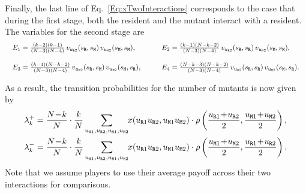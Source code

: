 \documentclass[11pt]{article}
\def\resident{\texttt{R}}
\def\mutant{\texttt{M}}
\def\strategy{s}
\theoremstyle{plainCl1}
\theoremstyle{plainCl2}
\begin{document}
Finally, the last line of Eq.~\eqref{Eq:xTwoInteractions} corresponds to the case that during the first stage, both the resident and the mutant interact with a resident. The variables for the second stage are
\begin{equation*}
  \setlength{\arraycolsep}{10pt}
    \begin{array}{llrl}
   E_1  = \frac{(k - 2)(k - 1)}{(N-3)(N-4)}\, v_{u_{\resident 2}}(\strategy_\resident,\strategy_\mutant)\, v_{u_{\mutant 2}}(\strategy_\mutant,\strategy_\mutant) , \quad
   &E_2 = \frac{\left(k - 1\right) \left(N - k - 2\right)}{(N - 3) (N - 4)}\, v_{u_{\resident 2}}(\strategy_\resident,\strategy_\resident)\, v_{u_{\mutant 2}}(\strategy_\mutant,\strategy_\mutant) , \\[0.5cm] 
   E_3  = \frac{\left(k - 1\right) \left(N - k - 2\right)}{(N - 3) (N - 4)}\, v_{u_{\resident 2}}(\strategy_\resident,\strategy_\mutant)\, v_{u_{\mutant 2}}(\strategy_\mutant,\strategy_\resident) , \quad
   &E_4 = \frac{\left(N - k - 3\right) \left(N - k - 2\right)}{(N - 3) (N - 4)} \,v_{u_{\resident 2}}(\strategy_\resident,\strategy_\resident)\, v_{u_{\mutant 2}}(\strategy_\mutant,\strategy_\resident) .
  \end{array}
\end{equation*}


\noindent
As a result, the transition probabilities for the number of mutants is now given by
\begin{equation}\label{eq:ratio_TwoInteractions}
\begin{array}{l}
\displaystyle \lambda^+_k=\frac{N\!-\!k}{N}\cdot \frac{k}{N} \sum_{u_{\resident 1},u_{\resident 2},u_{\mutant 1},u_{\mutant 2}} \hspace{-0.1cm} x(u_{\resident 1}u_{\resident 2}, u_{\mutant 1}u_{\mutant 2})\cdot \rho\left(\frac{u_{\resident 1} \!+\! u_{\resident 2}}{2}, \frac{u_{\mutant 1} \!+\! u_{\mutant 2}}{2}\right), \\[0.5cm]
\displaystyle \lambda^-_k=\frac{N\!-\!k}{N}\cdot \frac{k}{N} \sum_{u_{\resident 1},u_{\resident 2},u_{\mutant 1},u_{\mutant 2}} \hspace{-0.1cm} x(u_{\resident 1}u_{\resident 2},u_{\mutant 1}u_{\mutant 2})\cdot \rho\left(\frac{u_{\mutant 1} \!+\! u_{\mutant 2}}{2}, \frac{u_{\resident 1} \!+\! u_{\resident 2}}{2}\right).
\end{array}
\end{equation}
Note that we assume players to use their average payoff across their two interactions for comparisons.\\
\end{document}
